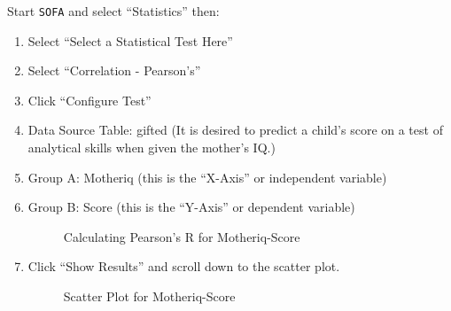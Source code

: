 Start \texttt{SOFA} and select ``Statistics'' then:

\begin{enumerate}
  \item Select ``Select a Statistical Test Here''
  \item Select ``Correlation - Pearson's''
  \item Click ``Configure Test''
  \item Data Source Table: gifted (It is desired to predict a child's score on a test of analytical skills when given the mother's IQ.)
  \item Group A: Motheriq (this is the ``X-Axis'' or independent variable)
  \item Group B: Score (this is the ``Y-Axis'' or dependent variable)

  \begin{figure}[H]
    \begin{center}
      \caption{Calculating Pearson's R for Motheriq-Score}
    \end{center}
  \end{figure}

  \item Click ``Show Results'' and scroll down to the scatter plot.
  
  \begin{figure}[H]
    \begin{center}
      \caption{Scatter Plot for Motheriq-Score}
    \end{center}
  \end{figure}


\end{enumerate}
